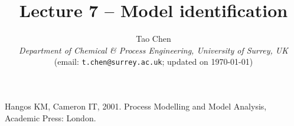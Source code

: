 \documentclass[a4paper,11pt]{article}
\title{\vspace{-2cm} Lecture 7 -- Model identification}
\author{Tao Chen\\
{\small \emph{Department of Chemical \& Process Engineering, University of Surrey, UK}}\\
{\small (email: \texttt{t.chen@surrey.ac.uk}; \hspace{0.5cm} updated on \today )}
}
\date{}
\theoremstyle{definition}
\begin{document}
\maketitle

\vspace{-0.5cm}




\begin{thebibliography}{2}
\vspace{-0.4cm}
	Hangos KM, Cameron IT, 2001. Process Modelling and Model Analysis, Academic Press: London.

\end{thebibliography}
\end{document}

